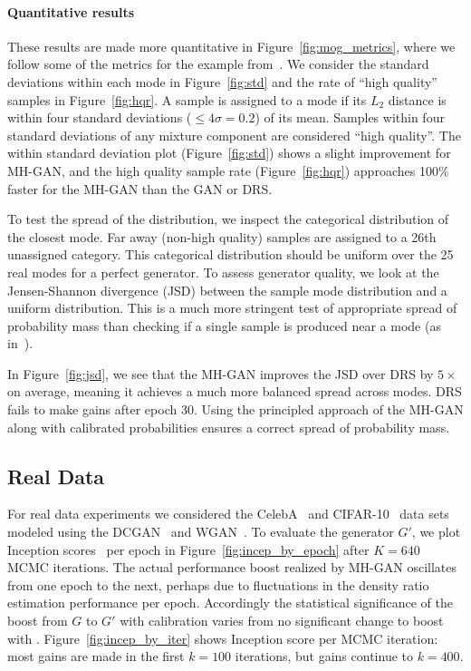 \documentclass{article}
\begin{document}
\paragraph{Quantitative results}
These results are made more quantitative in Figure~\ref{fig:mog_metrics}, where we follow some of the metrics for the example from~\citet{Azadi2018}.
We consider the standard deviations within each mode in Figure~\ref{fig:std} and the rate of ``high quality'' samples in Figure~\ref{fig:hqr}.
A sample is assigned to a mode if its $L_2$ distance is within four standard deviations ($\leq 4 \sigma = 0.2$) of its mean.
Samples within four standard deviations of any mixture component are considered ``high quality''.
The within standard deviation plot (Figure~\ref{fig:std}) shows a slight improvement for MH-GAN, and the high quality sample rate (Figure~\ref{fig:hqr}) approaches 100\% faster for the MH-GAN than the GAN or DRS\@.

To test the spread of the distribution, we inspect the categorical distribution of the closest mode.
Far away (non-high quality) samples are assigned to a 26th unassigned category.
This categorical distribution should be uniform over the 25 real modes for a perfect generator.
To assess generator quality, we look at the Jensen-Shannon divergence (JSD) between the sample mode distribution and a uniform distribution.
This is a much more stringent test of appropriate spread of probability mass than checking if a single sample is produced near a mode (as in~\citet{Azadi2018})\@.




In Figure~\ref{fig:jsd}, we see that the MH-GAN improves the JSD over DRS by $5 \times$ on average, meaning it achieves a much more balanced spread across modes.
DRS fails to make gains after epoch 30.
Using the principled approach of the MH-GAN along with calibrated probabilities ensures a correct spread of probability mass.

\subsection{Real Data}

For real data experiments we considered the CelebA~\citep{Liu2015} and CIFAR-10~\citep{Torralba2008} data sets modeled using the DCGAN~\citep{Radford2015} and WGAN~\citep{Arjovsky2017, Gulrajani2017}.
To evaluate the generator $G'$, we plot Inception scores~\citep{Salimans2016} per epoch in Figure~\ref{fig:incep_by_epoch} after $K=640$ MCMC iterations.
The actual performance boost realized by MH-GAN oscillates from one epoch to the next, perhaps due to fluctuations in the density ratio estimation performance per epoch.
Accordingly the statistical significance of the boost from $G$ to $G'$ with calibration varies from no significant change to boost with .
Figure~\ref{fig:incep_by_iter} shows Inception score per MCMC iteration:
most gains are made in the first $k=100$ iterations, but gains continue to $k=400$.
\end{document}
